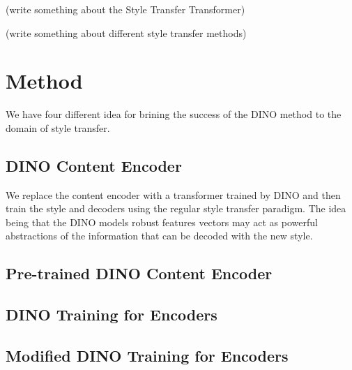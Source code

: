 \documentclass{article}
\begin{document}
(write something about the Style Transfer Transformer)

(write something about different style transfer methods)


\section{Method}

We have four different idea for brining the success of the DINO method to the domain of style transfer.

\subsection{DINO Content Encoder}

We replace the content encoder with a transformer trained by DINO and then train the style and decoders using the regular style transfer paradigm. The idea being that the DINO models robust features vectors may act as powerful abstractions of the information that can be decoded with the new style.

\subsection{Pre-trained DINO Content Encoder}

\subsection{DINO Training for Encoders}

\subsection{Modified DINO Training for Encoders}




\medskip

\nocite{*}


\end{document}
